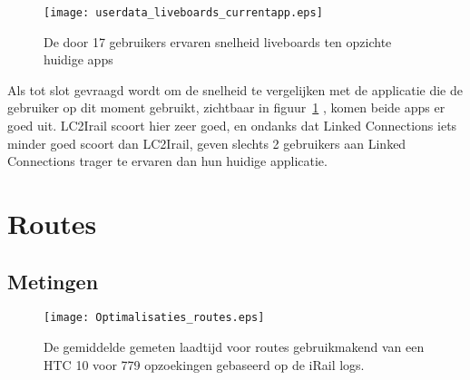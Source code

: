\begin{figure}[ht]
	\centering
	\texttt{[image: userdata\_liveboards\_currentapp.eps]}
	\caption[Door gebruikers ervaren snelheid liveboards tov huidige apps]{De door 17 gebruikers ervaren snelheid liveboards ten opzichte huidige apps }
	\label{fig:relativePerceptionLiveboards}
\end{figure}

Als tot slot gevraagd wordt om de snelheid te vergelijken met de applicatie die de gebruiker op dit moment gebruikt, zichtbaar in figuur~\ref{fig:relativePerceptionLiveboards} , komen beide apps er goed uit. LC2Irail scoort hier zeer goed, en ondanks dat Linked Connections iets minder goed scoort dan LC2Irail, geven slechts 2 gebruikers aan Linked Connections trager te ervaren dan hun huidige applicatie.

\section{Routes}

\subsection{Metingen}
\begin{figure}[h]
	\centering
	\texttt{[image: Optimalisaties\_routes.eps]}
	\caption[Gemeten laadtijd routes]{De gemiddelde gemeten laadtijd voor routes gebruikmakend van een HTC 10 voor 779 opzoekingen gebaseerd op de iRail logs.}
	\label{fig:routelabtest}
\end{figure}
%		

